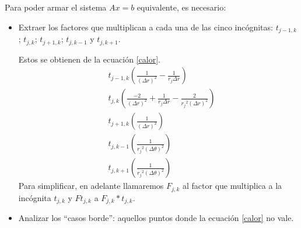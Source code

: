 Para poder armar el sistema $Ax=b$ equivalente, es necesario:
\begin{itemize}
 \item
    Extraer los factores que multiplican a cada una de las cinco incógnitas: $t_{j-1,k}$; $t_{j,k}$; $t_{j+1,k}$; $t_{j,k-1}$ y $t_{j,k+1}$.

    Estos se obtienen de la ecuación \ref{calor}.
    \begin{align*}
        &t_{j-1, k}(\frac{1}{(\Delta r)^2} - \frac{1}{r_j \Delta r}) \\
        &t_{j, k}(\frac{-2}{(\Delta r)^2} + \frac{1}{r_j \Delta r} - \frac{2}{{r_j}^2 (\Delta r)^2}) \\
        &t_{j+1, k}(\frac{1}{(\Delta r)^2}) \\
        &t_{j, k-1}(\frac{1}{{r_j}^2(\Delta \theta)^2}) \\
        &t_{j, k+1}(\frac{1}{{r_j}^2(\Delta \theta)^2})
    \end{align*}
    Para simplificar, en adelante llamaremos $F_{j,k}$ al factor que multiplica a la incógnita $t_{j,k}$ y $Ft_{j,k}$ a $F_{j,k}*t_{j,k}$.
 \item
    Analizar los ``casos borde'': aquellos puntos donde la ecuación \ref{calor} no vale.
    

\end{itemize}
